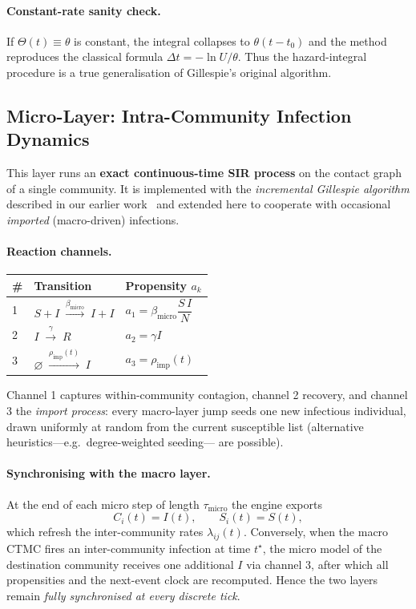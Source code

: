 \documentclass[
]{ceurart}
\begin{document}
\paragraph{Constant-rate sanity check.}
If \(\Theta(t)\equiv\theta\) is constant, the integral collapses to
\(\theta(t-t_0)\) and the method reproduces the classical formula
\(\Delta t=-\ln U/\theta\).  Thus the hazard-integral procedure is a true generalisation of Gillespie’s original algorithm.



\subsection{Micro-Layer: Intra-Community Infection Dynamics}
\label{sec:micro_layer}

This layer runs an \textbf{exact continuous-time SIR process} on the
contact graph of a single community.  It is implemented with the
\emph{incremental Gillespie algorithm} described in our earlier
work~\cite{kuryliak2025simulating} and extended here to cooperate with
occasional \emph{imported} (macro-driven) infections.

\paragraph{Reaction channels.}
\vspace{-0.6em}
\begin{center}
\begin{tabular}{lll}
\# & Transition & Propensity $a_k$ \\ \hline
1 & $S + I \;\xrightarrow{\beta_{\text{micro}}}\; I + I$ &
    $a_1 = \beta_{\text{micro}}\dfrac{S\,I}{N}$ \\[3pt]
2 & $I \;\xrightarrow{\gamma}\; R$ &
    $a_2 = \gamma I$ \\[3pt]
3 & $\varnothing \;\xrightarrow{\rho_{\text{imp}}(t)}\; I$ &
    $a_3 = \rho_{\text{imp}}(t)$
\end{tabular}
\end{center}

Channel 1 captures within-community contagion, channel 2 recovery, and
channel 3 the \emph{import process}: every macro-layer jump seeds one
new infectious individual, drawn uniformly at random from the current
susceptible list (alternative heuristics—e.g.\ degree-weighted seeding—
are possible).

\paragraph{Synchronising with the macro layer.}
At the end of each micro step of length $\tau_{\text{micro}}$ the engine
exports
\[
C_i(t)=I(t), \qquad S_i(t)=S(t),
\]
which refresh the inter-community rates $\lambda_{ij}(t)$.
Conversely, when the macro CTMC fires an inter-community infection at
time $t^\star$, the micro model of the destination community receives
one additional $I$ via channel 3, after which all propensities and the
next-event clock are recomputed.  Hence the two layers remain
\emph{fully synchronised at every discrete tick}.
\end{document}
